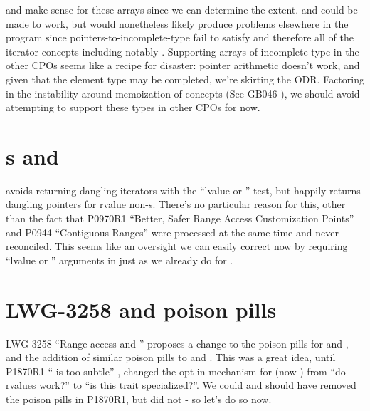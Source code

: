  and  make sense for these arrays since we can determine the extent.
 and  could be made to work,
but would nonetheless likely produce problems elsewhere in the program since
pointers-to-incomplete-type fail to satisfy 
and therefore all of the iterator concepts including notably .
Supporting arrays of incomplete type in the other CPOs seems like a recipe for disaster:
pointer arithmetic doesn't work, and given that the element type may be completed, we're skirting the ODR.
Factoring in the instability around memoization of concepts (See GB046 \cite{GB046}),
we should avoid attempting to support these types in other CPOs for now.


\section{s and }

 avoids returning dangling iterators
with the ``lvalue or '' test,
but  happily returns dangling pointers for rvalue non-s.
There's no particular reason for this, other than the fact that
P0970R1 ``Better, Safer Range Access Customization Points'' \cite{p0970r1} and
P0944 ``Contiguous Ranges'' \cite{p0944r0}
were processed at the same time and never reconciled.
This seems like an oversight we can easily correct now
by requiring ``lvalue or '' arguments
in  just as we already do for .


\section{LWG-3258 and poison pills}

LWG-3258 ``Range access and '' \cite{lwg3258}
proposes a change to the  poison pills
for  and , and
the addition of similar poison pills to  and .
This was a great idea, until
P1870R1 `` is too subtle'' \cite{p1870r1},
changed the opt-in mechanism for 
(now ) from ``do rvalues work?''
to ``is this trait specialized?''.
We could and should have removed the  poison pills
in P1870R1, but did not - so let's do so now.


